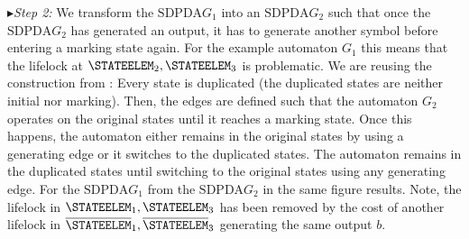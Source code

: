 \documentclass[draft]{ifacconf}
\newcommand{\STEP}[1]{\ensuremath{G_{#1}}\xspace}
\newcommand{\SDPDA}{\ensuremath{\mathrm{SDPDA}}\xspace}
\newcommand{\myparagraph}[1]{\par$\blacktriangleright$\emph{#1:}}
\begin{document}
\myparagraph{Step 2}
We transform the \SDPDA \STEP{1} into an \SDPDA \STEP{2} such that once the \SDPDA \STEP{2} has generated an output, it has to generate another symbol before entering a marking state again.
For the example automaton \STEP{1} this means that the lifelock at $\STATEELEM_2,\STATEELEM_3$ is problematic.
We are reusing the construction from \cite{DBLP:journals/iandc/Knuth65}:
Every state is duplicated (the duplicated states are neither initial nor marking).
Then, the edges are defined such that the automaton \STEP{2} operates on the original states until it reaches a marking state.
Once this happens, the automaton either remains in the original states by using a generating edge or it switches to the duplicated states.
The automaton remains in the duplicated states until switching to the original states using any generating edge.
For the \SDPDA \STEP{1} from  the \SDPDA \STEP{2} in the same figure results.
Note, the lifelock in $\STATEELEM_1,\STATEELEM_3$ has been removed by the cost of another lifelock in $\overline \STATEELEM_1,\overline \STATEELEM_3$ generating the same output $b$.
\end{document}
